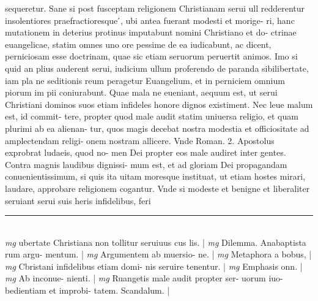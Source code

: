 \documentclass{article}
\begin{document}
\begin{pages}
sequeretur. Sane si post fusceptam religionem Christianam serui ull redderentur insolentiores praefractioresque ́, ubi antea fuerant modesti et morige- ri, hanc mutationem in deterius protinus imputabunt nomini Christiano et do- ctrinae euangelicae, statim omnes uno ore pessime de ea iudicabunt, ac dicent, perniciosam esse doctrinam, quae sic etiam seruorum peruertit animos. Imo si quid an plius auderent serui, iudicium ullum proferendo de paranda sibilibertate, iam pla ne seditionis reum peragetur Euangelium, et in perniciem omnium piorum im pii coniurabunt. Quae mala ne eueniant, aequum est, ut serui Christiani dominos suos etiam infideles honore dignos existiment. Nec leue malum est, id commit- tere, propter quod male audit statim uniuersa religio, et quam plurimi ab ea alienan- tur, quos magis decebat nostra modestia et officiositate ad amplectendam religi- onem nostram allicere. Vnde Roman. 2. Apostolus exprobrat ludaeis, quod no- men Dei propter eos male audiret inter gentes. Contra magnis laudibus dignissi- mum est, et ad gloriam Dei propagandam conuenientissimum, si quis ita uitam moresque instituat, ut etiam hostes mirari, laudare, approbare religionem cogantur. Vnde si modeste et benigne et liberaliter seruiant serui suis heris infidelibus, feri  \pend
\vspace{0.5cm}\noindent
\vspace{0.2cm}\rule{1cm}{0.2pt}\\ 
\hspace{0.2cm}\textit{mg}
\footnotesize ubertate Christiana non tollitur seruiuus cus lis. 
\normalsize| 
\hspace{0.2cm}\textit{mg}
\footnotesize Dilemma. Anabaptista rum argu- mentum. 
\normalsize| 
\hspace{0.2cm}\textit{mg}
\footnotesize Argumentem ab muersio- ne. 
\normalsize| 
\hspace{0.2cm}\textit{mg}
\footnotesize Metaphora a bobus, 
\normalsize| 
\hspace{0.2cm}\textit{mg}
\footnotesize Cbristani infidelibus etiam domi- nis seruire tenentur. 
\normalsize| 
\hspace{0.2cm}\textit{mg}
\footnotesize Emphasis onn. 
\normalsize| 
\hspace{0.2cm}\textit{mg}
\footnotesize Ab inconue- nienti. 
\normalsize| 
\hspace{0.2cm}\textit{mg}
\footnotesize Ruangetis male audit propter ser- uorum iuo- bedientiam et improbi- tatem. Scandalum. 
\normalsize| 

\end{pages}
\end{document}
